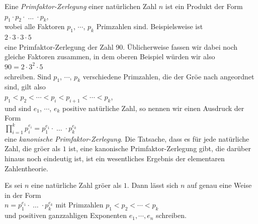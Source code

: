 Eine \emph{Primfaktor-Zerlegung} einer nat\"{u}rlichen Zahl $n$ ist ein Produkt der Form
\\[0.2cm]
\hspace*{1.3cm}
$p_1 \cdot p_2 \cdot\; \dots \;\cdot p_k$,
\\[0.2cm]
wobei alle Faktoren $p_1$, $\cdots$, $p_k$ Primzahlen sind.  Beispielsweise ist
\\[0.2cm]
\hspace*{1.3cm}
$2 \cdot 3 \cdot 3 \cdot 5$
\\[0.2cm]
eine Primfaktor-Zerlegung der Zahl 90.  \"{U}blicherweise fassen wir dabei noch gleiche Faktoren
zusammen, in dem oberen Beispiel w\"{u}rden wir also
\\[0.2cm]
\hspace*{1.3cm}
$90 = 2 \cdot 3^2 \cdot 5$
\\[0.2cm]
schreiben.  Sind $p_1$, $\cdots$, $p_k$ verschiedene Primzahlen, die der Gr\"{o}\3e nach angeordnet sind,
gilt also
\\[0.2cm]
\hspace*{1.3cm}
$p_1 < p_2 < \cdots < p_{i} < p_{i+1} < \cdots < p_k$,
\\[0.2cm]
und sind $e_1$, $\cdots$, $e_k$ positive nat\"{u}rliche Zahl, so nennen wir einen Ausdruck der Form
\\[0.2cm]
\hspace*{1.3cm}
$\prod\limits_{i=1}^k  p_i^{e_i} = p_1^{e_1} \cdot \;\dots\; \cdot p_k^{e_k}$
\\[0.2cm]
eine \emph{kanonische Primfaktor-Zerlegung}.  Die Tatsache, dass es f\"{u}r jede nat\"{u}rliche Zahl, die
gr\"{o}\3er als $1$ ist, eine kanonische Primfaktor-Zerlegung gibt, die dar\"{u}ber hinaus noch eindeutig
ist,  ist ein wesentliches Ergebnis der elementaren Zahlentheorie.


\begin{Theorem}
\label{theorem:fundamental-arithmetik} \lb
  Es sei $n$ eine nat\"{u}rliche Zahl gr\"{o}\3er als $1$.  Dann l\"{a}sst sich $n$ auf genau eine Weise in der Form
  \\[0.2cm]
  \hspace*{1.3cm}
  $n = p_1^{e_1} \cdot \;\dots\; \cdot p_k^{e_k}$ \quad mit Primzahlen $p_1 < p_2 < \cdots < p_k$
  \\[0.2cm]
  und positiven ganzzahligen Exponenten $e_1, \cdots, e_n$ schreiben.
\end{Theorem}

